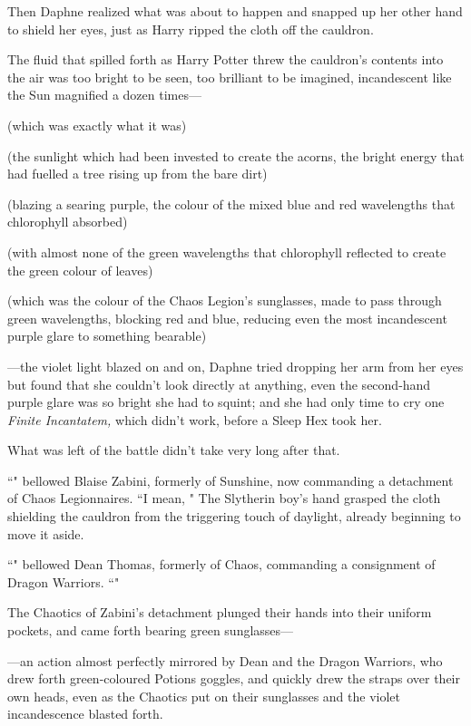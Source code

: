 Then Daphne realized what was about to happen and snapped up her other hand to shield her eyes, just as Harry ripped the cloth off the cauldron.

The fluid that spilled forth as Harry Potter threw the cauldron's contents into the air was too bright to be seen, too brilliant to be imagined, incandescent like the Sun magnified a dozen times—

(which was exactly what it was)

(the sunlight which had been invested to create the acorns, the bright energy that had fuelled a tree rising up from the bare dirt)

(blazing a searing purple, the colour of the mixed blue and red wavelengths that chlorophyll absorbed)

(with almost none of the green wavelengths that chlorophyll reflected to create the green colour of leaves)

(which was the colour of the Chaos Legion's sunglasses, made to pass through green wavelengths, blocking red and blue, reducing even the most incandescent purple glare to something bearable)

—the violet light blazed on and on, Daphne tried dropping her arm from her eyes but found that she couldn't look directly at anything, even the second-hand purple glare was so bright she had to squint; and she had only time to cry one \emph{Finite Incantatem,} which didn't work, before a Sleep Hex took her.

What was left of the battle didn't take very long after that.

\later

``" bellowed Blaise Zabini, formerly of Sunshine, now commanding a detachment of Chaos Legionnaires. ``I mean, " The Slytherin boy's hand grasped the cloth shielding the cauldron from the triggering touch of daylight, already beginning to move it aside.

``" bellowed Dean Thomas, formerly of Chaos, commanding a consignment of Dragon Warriors. ``"

The Chaotics of Zabini's detachment plunged their hands into their uniform pockets, and came forth bearing green sunglasses—

—an action almost perfectly mirrored by Dean and the Dragon Warriors, who drew forth green-coloured Potions goggles, and quickly drew the straps over their own heads, even as the Chaotics put on their sunglasses and the violet incandescence blasted forth.

